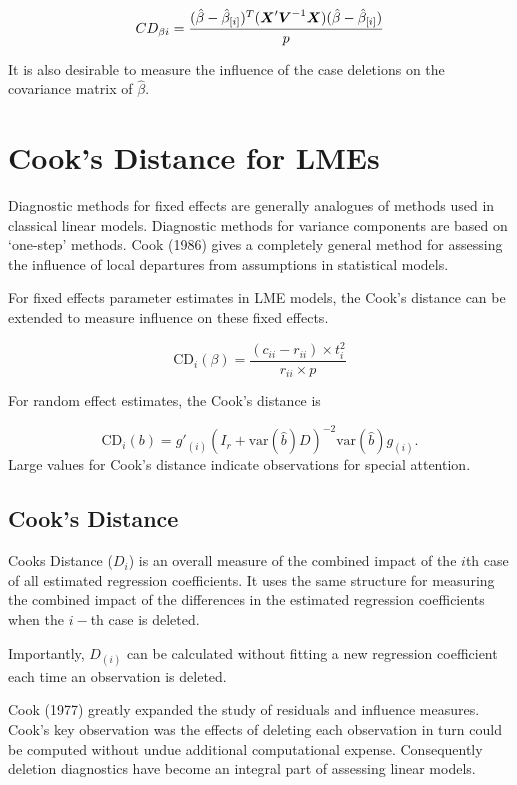 \documentclass[12pt, a4paper]{report}
\theoremstyle{plain}
\theoremstyle{definition}
\theoremstyle{remark}
\begin{document}
		\[ CD_{\beta i} = {(\hat{\beta} - \hat{\beta}_{[i]})^{T}(\boldsymbol{X}^{\prime}\boldsymbol{V}^{-1}\boldsymbol{X}) (\hat{\beta} - \hat{\beta}_{[i]}) \over p}\]
		
		It is also desirable to measure the influence of the case deletions on the covariance matrix of $\hat{\beta}$.
		
		
		
		

		
		
\section{Cook's Distance for LMEs} %
Diagnostic methods for fixed effects are generally analogues of methods used in classical linear models.
Diagnostic methods for variance components are based on `one-step' methods. Cook (1986) gives a completely general method for assessing the influence of local departures from assumptions in statistical models.

For fixed effects parameter estimates in LME models, the  Cook's distance can be extended to measure influence on these fixed effects.

\[
\mbox{CD}_{i}(\beta) = \frac{(c_{ii} - r_{ii}) \times t^2_{i}}{r_{ii} \times p}
\]

For random effect estimates, the  Cook's distance is

\[
\mbox{CD}_{i}(b) = g{\prime}_{(i)} (I_{r} + \mbox{var}(\hat{b})D)^{-2}\mbox{var}(\hat{b})g_{(i)}.
\]
Large values for Cook's distance indicate observations for special attention.


\subsection*{Cook's Distance}%
Cooks Distance ($D_{i}$) is an overall measure of the combined impact of the $i$th case of all estimated regression coefficients. It uses the same structure for measuring the combined impact of the differences in the estimated regression coefficients when the $i-$th case is deleted.

Importantly, $D_{(i)}$ can be calculated without fitting a new regression coefficient each time an observation is deleted.




Cook (1977) greatly expanded the study of residuals and influence measures. Cook's key observation was the effects of deleting each observation in turn could be computed without undue additional computational expense. Consequently deletion diagnostics have become an integral part of assessing linear models.
\end{document}
